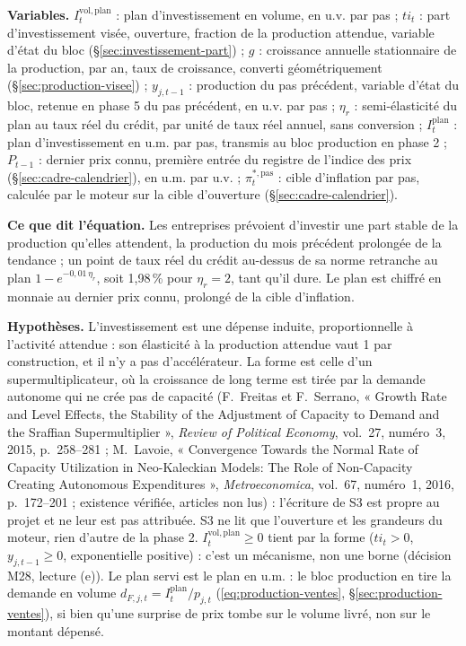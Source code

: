 \documentclass[11pt,a4paper]{article}
\newcommand{\variables}{\par\noindent\textbf{Variables.} }
\newcommand{\sens}{\par\noindent\textbf{Ce que dit l'équation.} }
\newcommand{\hyp}{\par\noindent\textbf{Hypothèses.} }
\begin{document}
\begin{proposee}
\variables $I^{\mathrm{vol},\mathrm{plan}}_t$ : plan d'investissement en volume, en u.v. par pas ; $\mathit{ti}_t$ : part d'investissement visée, ouverture, fraction de la production attendue, variable d'état du bloc (\S\ref{sec:investissement-part}) ; $g$ : croissance annuelle stationnaire de la production, par an, taux de croissance, converti géométriquement (\S\ref{sec:production-visee}) ; $y_{j,t-1}$ : production du pas précédent, variable d'état du bloc, retenue en phase 5 du pas précédent, en u.v. par pas ; $\eta_r$ : semi-élasticité du plan au taux réel du crédit, par unité de taux réel annuel, sans conversion ; $I^{\mathrm{plan}}_t$ : plan d'investissement en u.m. par pas, transmis au bloc production en phase 2 ; $P_{t-1}$ : dernier prix connu, première entrée du registre de l'indice des prix (\S\ref{sec:cadre-calendrier}), en u.m. par u.v. ; $\pi^{\ast,\mathrm{pas}}_t$ : cible d'inflation par pas, calculée par le moteur sur la cible d'ouverture (\S\ref{sec:cadre-calendrier}).
\sens Les entreprises prévoient d'investir une part stable de la production qu'elles attendent, la production du mois précédent prolongée de la tendance ; un point de taux réel du crédit au-dessus de sa norme retranche au plan $1 - e^{-0{,}01\,\eta_r}$, soit 1,98\,\% pour $\eta_r = 2$, tant qu'il dure. Le plan est chiffré en monnaie au dernier prix connu, prolongé de la cible d'inflation.
\hyp L'investissement est une dépense induite, proportionnelle à l'activité attendue : son élasticité à la production attendue vaut 1 par construction, et il n'y a pas d'accélérateur. La forme est celle d'un supermultiplicateur, où la croissance de long terme est tirée par la demande autonome qui ne crée pas de capacité (F.~Freitas et F.~Serrano, « Growth Rate and Level Effects, the Stability of the Adjustment of Capacity to Demand and the Sraffian Supermultiplier », \emph{Review of Political Economy}, vol.~27, numéro~3, 2015, p.~258--281 ; M.~Lavoie, « Convergence Towards the Normal Rate of Capacity Utilization in Neo-Kaleckian Models: The Role of Non-Capacity Creating Autonomous Expenditures », \emph{Metroeconomica}, vol.~67, numéro~1, 2016, p.~172--201 ; existence vérifiée, articles non lus) : l'écriture de S3 est propre au projet et ne leur est pas attribuée. S3 ne lit que l'ouverture et les grandeurs du moteur, rien d'autre de la phase 2. $I^{\mathrm{vol},\mathrm{plan}}_t \ge 0$ tient par la forme ($\mathit{ti}_t > 0$, $y_{j,t-1} \ge 0$, exponentielle positive) : c'est un mécanisme, non une borne (décision M28, lecture (e)). Le plan servi est le plan en u.m. : le bloc production en tire la demande en volume $d_{F,j,t} = I^{\mathrm{plan}}_t/p_{j,t}$ (\eqref{eq:production-ventes}, \S\ref{sec:production-ventes}), si bien qu'une surprise de prix tombe sur le volume livré, non sur le montant dépensé.

\end{proposee}
\end{document}
